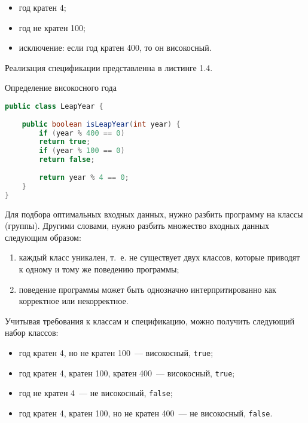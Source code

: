 \begin{itemize}
	\item год кратен 4;
	\item год не кратен 100;
	\item исключение: если год кратен 400, то он високосный.
\end{itemize}

Реализация спецификации представленна в листинге 1.4.

\begin{ListingEnv}[!h]%
	\captiondelim{ } %
	\caption{Определение високосного года}
	\begin{lstlisting}[language={Java}]
public class LeapYear {
	
	public boolean isLeapYear(int year) {
		if (year % 400 == 0)
		return true;
		if (year % 100 == 0)
		return false;
		
		return year % 4 == 0;
	}
}
	\end{lstlisting}
\end{ListingEnv}%

 Для подбора оптимальных входных данных, нужно разбить программу на классы (группы). Другими словами, нужно разбить множество входных данных следующим образом:
 
 \begin{enumerate}
 	\item каждый класс уникален, т.~е. не существует двух классов, которые приводят к одному и тому же поведению программы;
 	\item поведение программы может быть однозначно интерпритированно как корректное или некорректное.
 \end{enumerate}

Учитывая требования к классам и спецификацию, можно получить следующий набор классов:

 \begin{itemize}
 	\item год кратен 4, но не кратен 100~--- високосный, \texttt{true};
 	\item год кратен 4, кратен 100, кратен 400~--- високосный, \texttt{true};
 	\item год не кратен 4~--- не високосный, \texttt{false};
 	\item год кратен 4, кратен 100, но не кратен 400~--- не високосный, \texttt{false}.
 \end{itemize}

